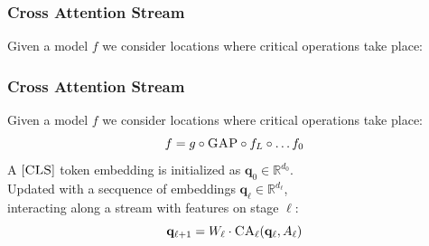 \begin{frame}[t]
    \frametitle{Cross Attention Stream}
    \small
    Given a model $f$ we consider locations where critical operations take place:
    \\
\end{frame}
\begin{frame}[t]
    \frametitle{Cross Attention Stream}
    \small
    Given a model $f$ we consider locations where critical operations take place:
    \\
    \begin{equation}
        f = g \circ \textsc{GAP} \circ f_L \circ \dots f_0
    \end{equation}\pause
    A $[\textsc{CLS}]$ token embedding is initialized as  $\mathbf{q}_0 \in 
    \mathbb{R}^{d_0}$.\\\pause
    Updated with a secquence of embeddings $\mathbf{q}_\ell \in \mathbb{R}^{d_\ell}$,\\
    interacting along a stream with features on stage  $\ell$:
    \begin{equation}
        \mathbf{q}_{\ell+1} = W_\ell\cdot\textsc{CA}_\ell (\mathbf{q}_\ell, A_\ell)
    \end{equation}   
\end{frame}